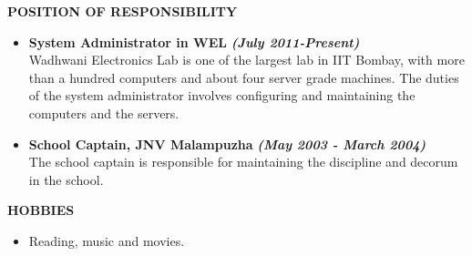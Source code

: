 \documentclass[a4paper,10pt]{article}
\begin{document}
 \colorbox{titleColor}{\parbox{6.5in}{\textbf{POSITION OF RESPONSIBILITY}}}

 \begin{itemize}
 \setlength{\itemsep}{1pt}
 \item \textbf{System Administrator in WEL} \textbf \emph{(July 2011-Present)} \\
Wadhwani Electronics Lab is one of the largest lab in IIT Bombay, with more than a hundred computers and about 
four server grade machines. The duties of the system administrator involves configuring and maintaining the
computers and the servers.
\item \textbf{School Captain, JNV Malampuzha} \textbf \emph{(May 2003 - March 2004)} \\
The school captain is responsible for maintaining the discipline and decorum in the school.
 \end{itemize}


 \colorbox{titleColor}{\parbox{6.5in}{\textbf{HOBBIES}}}

  \begin{itemize}
 \setlength{\itemsep}{1pt}
    \item Reading, music and movies.
  \end{itemize}
\end{document}
